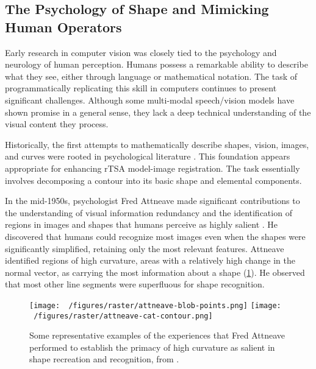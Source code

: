 \subsection{The Psychology of Shape and Mimicking Human Operators}
Early research in computer vision was closely tied to the psychology and neurology of human perception.
Humans possess a remarkable ability to describe what they see, either through language or mathematical notation.
The task of programmatically replicating this skill in computers continues to present significant challenges.
Although some multi-modal speech/vision models have shown promise in a general sense, they lack a deep technical understanding of the visual content they process.


Historically, the first attempts to mathematically describe shapes, vision, images, and curves were rooted in psychological literature \cite{attneaveInformationalAspectsVisual1954,attneaveQuantitativeStudyShape1956,koenderinkStructureImages1984,koenderinkSurfaceShapeCurvature1992}.
This foundation appears appropriate for enhancing rTSA model-image registration.
The task essentially involves decomposing a contour into its basic shape and elemental components.

In the mid-1950s, psychologist Fred Attneave made significant contributions to the understanding of visual information redundancy and the identification of regions in images and shapes that humans perceive as highly salient \cite{attneaveQuantitativeStudyShape1956,attneaveInformationalAspectsVisual1954}.
He discovered that humans could recognize most images even when the shapes were significantly simplified, retaining only the most relevant features.
Attneave identified regions of high curvature, areas with a relatively high change in the normal vector, as carrying the most information about a shape (\cref{fig:attneave}).
He observed that most other line segments were superfluous for shape recognition.


\begin{figure}[h!]
  \centering
  \texttt{[image: ~/figures/raster/attneave-blob-points.png]}
  \texttt{[image: ~/figures/raster/attneave-cat-contour.png]}
  \caption{Some representative examples of the experiences that Fred Attneave performed to establish the primacy of high curvature as salient in shape recreation and recognition, from \cite{attneaveInformationalAspectsVisual1954}.}
  \label{fig:attneave}
\end{figure}

